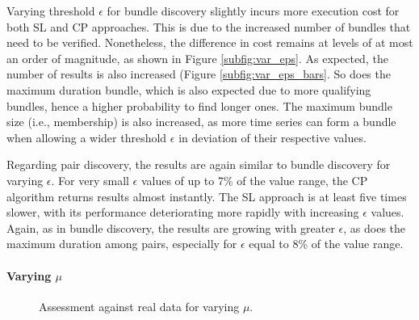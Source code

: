 Varying threshold $\epsilon$ for bundle discovery slightly incurs more execution cost for both SL and CP approaches. This is due to the increased number of bundles that need to be verified. Nonetheless, the difference in cost remains at levels of at most an order of magnitude, as shown in Figure \ref{subfig:var_eps}. As expected, the number of results is also increased (Figure \ref{subfig:var_eps_bars}. So does the maximum duration bundle, which is also expected due to more qualifying bundles, hence a higher probability to find longer ones. The maximum bundle size (i.e., membership) is also increased, as more time series can form a bundle when allowing a wider threshold $\epsilon$ in deviation of their respective values.

Regarding pair discovery, the results are again similar to bundle discovery for varying $\epsilon$. For very small $\epsilon$ values of up to 7\% of the value range, the CP algorithm returns results almost instantly. The SL approach is at least five times slower, with its performance deteriorating more rapidly with increasing $\epsilon$ values. Again, as in bundle discovery, the results are growing with greater $\epsilon$, as does the maximum duration among pairs, especially for $\epsilon$ equal to 8\% of the value range.

\paragraph{Varying $\mu$}
\begin{figure}[!ht]
 \centering
 \caption{Assessment against real data for varying $\mu$.}
 \label{fig:exp3}
\end{figure}

